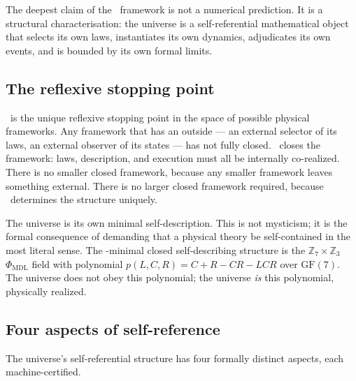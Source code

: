 \documentclass[11pt,openany]{book}
\theoremstyle{remark}
\newcommand{\GTE}{\text{GTE}}
\newcommand{\MDL}{\text{MDL}}
\newcommand{\PSC}{\text{PSC}}
\newcommand{\PHIMDL}{\Phi_{\mathrm{MDL}}}
\newcommand{\ZS}{\mathbb{Z}_7}
\begin{document}
The deepest claim of the \GTE\ framework is not a numerical prediction. It is a
structural characterisation: the universe is a self-referential mathematical object
that selects its own laws, instantiates its own dynamics, adjudicates its own events,
and is bounded by its own formal limits.

\subsection*{The reflexive stopping point}

\PSC\ is the unique reflexive stopping point in the space of possible physical
frameworks. Any framework that has an outside --- an external selector of its laws,
an external observer of its states --- has not fully closed. \PSC\ closes the
framework: laws, description, and execution must all be internally co-realized. There
is no smaller closed framework, because any smaller framework leaves something
external. There is no larger closed framework required, because \PSC\ determines the
structure uniquely.

The universe is its own minimal self-description. This is not mysticism; it is the
formal consequence of demanding that a physical theory be self-contained in the most
literal sense. The \MDL-minimal closed self-describing structure is the
$\ZS \times \mathbb{Z}_3$ $\PHIMDL$ field with polynomial $p(L,C,R) = C{+}R{-}CR{-}LCR$
over $\mathrm{GF}(7)$. The universe does not obey this polynomial; the universe
\emph{is} this polynomial, physically realized.

\subsection*{Four aspects of self-reference}

The universe's self-referential structure has four formally distinct aspects, each
machine-certified.
\end{document}
